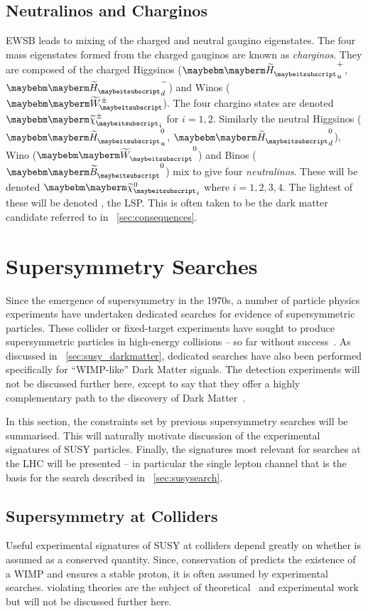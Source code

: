 \subsection{Neutralinos and Charginos}
\ac{EWSB} leads to mixing of the charged and neutral gaugino eigenstates. The
four mass eigenstates formed from the charged gauginos are known as
\emph{charginos}. They are composed of the charged Higgsinos ($\PSHiggs_u^+$,
$\PSHiggs_d^-$) and Winos ($\PSWpm$). The four chargino states are denoted
$\PScharginopm_i$ for $i=1,2$. Similarly the neutral Higgsinos ($\PSHiggs_u^0$,
$\PSHiggs_d^0$), Wino ($\PSW^0$) and Binos ($\PSB^0$) mix to give four
\emph{neutralinos}. These will be denoted $\PSneutralino_i$ where
$i=1,2,3,4$. The lightest of these will be denoted \PSneutralino, the
\ac{LSP}. This is often taken to be the dark matter candidate referred to in
\sec~\ref{sec:consequences}.

\section{Supersymmetry Searches}
Since the emergence of supersymmetry in the 1970s, a number of particle physics
experiments have undertaken dedicated searches for evidence of supersymmetric
particles. These collider or fixed-target experiments have sought to produce
supersymmetric particles in high-energy collisions -- so far without
success~\cite{ua1_susy,aleph_susy,d0_susy,hera_susy}. As discussed in
\sec~\ref{sec:susy_darkmatter}, dedicated searches have also been performed
specifically for ``\ac{WIMP}-like'' Dark Matter signals. The detection
experiments will not be discussed further here, except to say that they offer a
highly complementary path to the discovery of Dark
Matter~\cite{mastercode_2011}.

In this section, the constraints set by previous supersymmetry searches will be
summarised. This will naturally motivate discussion of the experimental
signatures of \ac{SUSY} particles. Finally, the signatures most relevant for
searches at the \ac{LHC} will be presented -- in particular the single lepton
channel that is the basis for the search described in
\chap~\ref{sec:susysearch}.

\subsection{Supersymmetry at Colliders}
Useful experimental signatures of \ac{SUSY} at colliders depend greatly on
whether \Rparity is assumed as a conserved quantity. Since, conservation of
\Rparity predicts the existence of a \ac{WIMP} and ensures a stable proton, it
is often assumed by experimental searches. \Rparity violating theories are the
subject of theoretical~\cite{aulakh_rpv} and experimental work but will not be
discussed further here.

